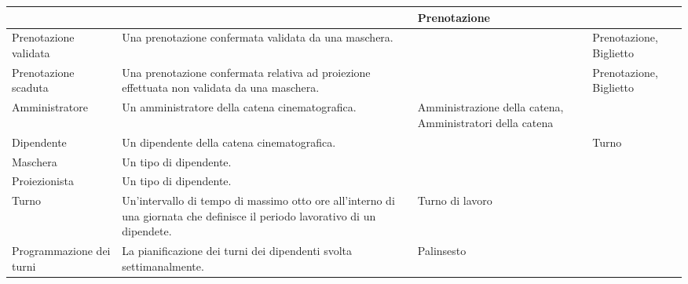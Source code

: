 \begin{longtable}{|p{3.86cm}|p{3.86cm}|p{3.86cm}|p{3.86cm}|}
       &
       & Prenotazione
      \\ \hline
      Prenotazione validata
       & Una prenotazione confermata validata da una maschera.
       &
       & Prenotazione, Biglietto
      \\ \hline
      Prenotazione scaduta
       & Una prenotazione confermata relativa ad proiezione effettuata
      non validata da una maschera.
       &
       & Prenotazione, Biglietto
      \\ \hline
      Amministratore
       & Un amministratore della catena cinematografica.
       & Amministrazione della catena, Amministratori della catena
       &
      \\ \hline
      Dipendente
       & Un dipendente della catena cinematografica.
       &
       & Turno
      \\ \hline
      Maschera
       & Un tipo di dipendente.
       &
       &
      \\ \hline
      Proiezionista
       & Un tipo di dipendente.
       &
       &
      \\ \hline
      Turno
       & Un'intervallo di tempo di massimo otto ore all'interno di una giornata
      che definisce il periodo lavorativo di un dipendete.
       & Turno di lavoro
       &
      \\ \hline
      Programmazione dei turni
       & La pianificazione dei turni dei dipendenti svolta settimanalmente.
       & Palinsesto
       &
      \\ \hline
\end{longtable}

\pagebreak

